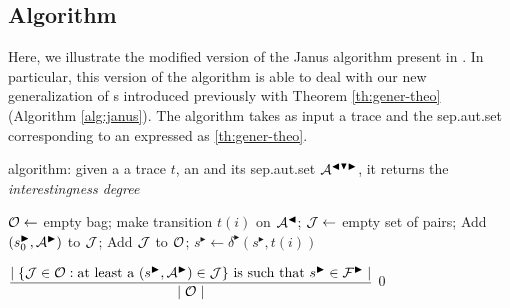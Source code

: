 \subsection{Algorithm}\label{sec:janus-alg}
Here, we illustrate the modified version of the Janus algorithm present in \citep{cecconi2018interestingness}. In particular, this version of the algorithm is able to deal with our new generalization of \rcon s introduced previously with Theorem \ref{th:gener-theo} (Algorithm \ref{alg:janus}). The algorithm takes as input a trace and the sep.aut.set corresponding to an \rcon\xspace expressed as \ref{th:gener-theo}.

\begin{algorithm}
	\caption{\janus algorithm: given a a trace $t$, an \rcon\xspace and its sep.aut.set $\mathcal{A}^{\blacktriangleleft \blacktriangledown \blacktriangleright}$, it returns the \textit{interestingness degree}}
	\label{alg:janus}
	\begin{algorithmic}[1]
		\State $\mathcal{O} \gets$ empty bag;
		\ForEach{$\automaton^\blacktriangleleft \in \automaton^{\blacktriangleleft \blacktriangledown \blacktriangleright}$} make transition $t(i)$ on $\mathcal{A}^\blacktriangleleft$;
		\EndFor
		 \label{alg:activation}
			\State $\mathcal{J} \gets$ empty set of pairs;
				\ForEach{$(\automaton^{\blacktriangleleft}, \automaton^{\blacktriangledown}, \automaton^{\blacktriangleright}) \in \automaton^{\blacktriangleleft \blacktriangledown \blacktriangleright}$}
						\State Add $(s_{0}^{\blacktriangleright}, \mathcal{A}^\blacktriangleright)$ to $\mathcal{J}$;
					\EndIf	
				\EndFor
				\State Add $\mathcal{J}$ to $\mathcal{O}$;
		\EndIf 		
		\ForEach{$\J \in \O$}
			 $s^{\blacktriangleright} \gets \delta^{\blacktriangleright}(s^{\blacktriangleright}, t(i)) $	
			\EndFor
		\EndFor
		\EndFor		

		\State \Return $\dfrac{\mid \{\mathcal{J} \in \mathcal{O}: \text{at least a } (s^{\blacktriangleright}, \mathcal{A}^\blacktriangleright) \in \mathcal{J} \} \text{ is such that } s^{\blacktriangleright} \in \mathcal{F}^{\blacktriangleright} \mid}{\mid \mathcal{O} \mid}$
		\Else
		\State \Return $0$
		\EndIf
		
	
	\end{algorithmic}
\end{algorithm}

